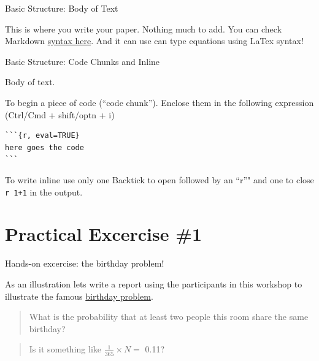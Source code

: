 \begin{frame}[fragile]{Basic Structure: Body of Text}

\begin{Shaded}
\begin{Highlighting}[]
\OperatorTok{---}
\OperatorTok{---}
\end{Highlighting}
\end{Shaded}

This is where you write your paper. Nothing much to add. You can check
Markdown
\href{https://www.rstudio.com/wp-content/uploads/2015/02/rmarkdown-cheatsheet.pdf}{syntax
here}. And it can use can type equations using LaTex syntax!

\end{frame}

\begin{frame}[fragile]{Basic Structure: Code Chunks and Inline}

\begin{Shaded}
\begin{Highlighting}[]
\OperatorTok{---}
\OperatorTok{---}
\end{Highlighting}
\end{Shaded}

Body of text.

To begin a piece of code (``code chunk''). Enclose them in the following
expression (Ctrl/Cmd + shift/optn + i)

\begin{verbatim}
```{r, eval=TRUE}
here goes the code
```
\end{verbatim}

To write inline use only one Backtick to open followed by an ``r''" and
one to close \texttt{\textasciigrave{}r\ 1+1\textasciigrave{}} in the
output.

\end{frame}

\section{Practical Excercise \#1}\label{practical-excercise-1}

\begin{frame}{Hands-on excercise: the birthday problem!}

As an illustration lets write a report using the participants in this
workshop to illustrate the famous
\href{https://en.wikipedia.org/wiki/Birthday_problem}{birthday problem}.

\begin{quote}
What is the probability that at least two people this room share the
same birthday?
\end{quote}

\begin{quote}
Is it something like \(\frac{1}{365} \times N =\) 0.11?
\end{quote}

\end{frame}

